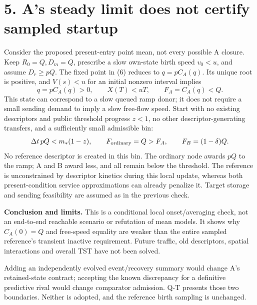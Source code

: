 \documentclass[11pt,a4paper]{article}
\begin{document}
\newpage
\section*{5. A's steady limit does not certify sampled startup}
Consider the proposed present-entry point mean, not every possible A closure.
Keep $R_0=Q,D_m=Q$, prescribe a slow own-state birth speed $v_0<u$, and assume
$D_r\ge pQ$. The fixed point in (6) reduces to $q=pC_A(q)$. Its unique root
is positive, and $V(s)<u$ for an initial nonzero interval implies
\begin{equation}
 q=pC_A(q)>0,\qquad X(T)<uT,\qquad
 F_A=C_A(q)<Q.
\end{equation}
This state can correspond to a slow queued ramp donor; it does not require
a small sending demand to imply a slow free-flow speed. Start with no existing
descriptors and public threshold progress $z<1$, no other descriptor-generating
transfers, and a sufficiently small admissible bin:
\begin{equation}
 \Delta t\,pQ<m_*(1-z),\qquad
 F_{\rm ordinary}=Q>F_A,\qquad F_B=(1-\delta)Q.
\end{equation}
No reference descriptor is created in this bin. The ordinary node awards $pQ$
to the ramp; A and B award less, and all remain below the threshold. The
reference is unconstrained by descriptor kinetics during this local update,
whereas both present-condition service approximations can already penalize it.
Target storage and sending feasibility are assumed as in the previous check.

\textbf{Conclusion and limits.} This is a conditional local onset/averaging
check, not an end-to-end reachable scenario or refutation of mean models. It
shows why $C_A(0)=Q$ and free-speed equality are weaker than the entire sampled
reference's transient inactive requirement. Future traffic, old descriptors,
spatial interactions and overall TST have not been solved.

Adding an independently evolved event/recovery summary would change A's
retained-state contract; accepting the known discrepancy for a definitive
predictive rival would change comparator admission. Q-T presents those two
boundaries. Neither is adopted, and the reference birth sampling is unchanged.
\end{document}
